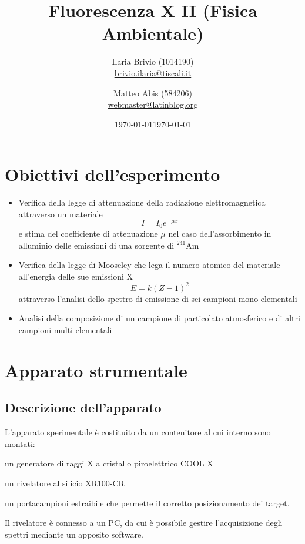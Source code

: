 \documentclass[italian,a4paper]{article}
\newenvironment{packed_item}{
\begin{itemize}
  \setlength{\itemsep}{1pt}
  \setlength{\parskip}{0pt}
  \setlength{\parsep}{0pt}
}{\end{itemize}}
\newcommand{\Am}{$^{241}$Am}
\begin{document}
\title{Fluorescenza X II (Fisica Ambientale)}
\author{\normalsize Ilaria Brivio (1014190)\\%
\normalsize \url{brivio.ilaria@tiscali.it}%
\and %
\normalsize Matteo Abis (584206)\\ %
\normalsize \url{webmaster@latinblog.org}
}
\date{\today}
\date{\today}
\maketitle
\section{Obiettivi dell'esperimento}
\begin{itemize}
\item Verifica della legge di attenuazione della radiazione elettromagnetica attraverso un materiale
$$ I = I_{0}e^{-\mu x}$$
 e stima del coefficiente di attenuazione $\mu$ nel caso dell'assorbimento in alluminio delle emissioni di una sorgente di \Am
\item Verifica della legge di Mooseley che lega il numero atomico del materiale all'energia delle sue emissioni X 
$$ E = k (Z - 1)^{2}$$
attraverso l'analisi dello spettro di emissione di sei campioni mono-elementali
\item Analisi della composizione di un campione di particolato atmosferico e di altri campioni multi-elementali
\end{itemize}

\section{Apparato strumentale}
\subsection*{Descrizione dell'apparato}
L'apparato sperimentale è costituito da un contenitore al cui interno sono montati:
\begin{packed_item}
\item un generatore di raggi X a cristallo piroelettrico COOL X
\item un rivelatore al silicio XR100-CR
\item un portacampioni estraibile che permette il corretto posizionamento dei target.
\end{packed_item}
Il rivelatore è connesso a un PC, da cui è possibile gestire l'acquisizione degli spettri mediante un apposito software.
\end{document}

